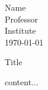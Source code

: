 \documentclass[12pt]{article}
\begin{document}
\begin{flushleft}
Name\\
Professor\\
Institute\\
\today\\
\end{flushleft}

\begin{center}
Title
\end{center}
\setlength{\parindent}{0.5in}
content...
\printbibliography
\end{document}
